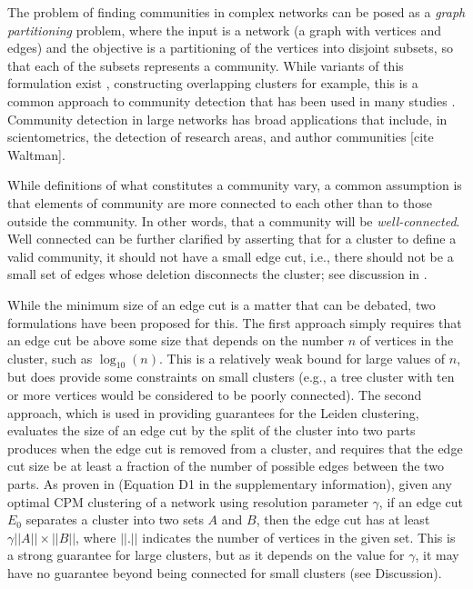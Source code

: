 \documentclass[12pt, oneside]{article}   	%
\begin{document}
The problem of finding communities in complex networks can be posed as a {\em graph partitioning} problem, where the input is a network (a graph with vertices and edges) and the
objective is a partitioning of the vertices into disjoint subsets, so that each of the subsets represents a community. While variants of this formulation exist \citep{Coscia2011}, constructing 
overlapping clusters for example, this is a common approach to community detection that has been used in many studies \citep{Fortunato2022,Fortunato2010}. Community detection in 
large networks has broad applications that include, in scientometrics, the detection of research areas, and author communities [cite Waltman].

While definitions of what constitutes a community vary, a common assumption is that elements of community are more connected to each other than to those outside the community. 
In other words, that a community will be {\em well-connected}. Well connected can be further clarified by asserting that for a cluster to define a valid community, it  should not have a small 
edge cut, i.e., there should not be a small set of edges whose deletion disconnects the cluster; see discussion in \citep{Traag_2019}. 


While the minimum size of an edge cut is a matter that can be debated, two formulations have been proposed for this.
The first approach simply requires that an edge cut be above some size that depends on the number $n$ of vertices in the cluster, such as $\log_{10}(n)$. 
This is a relatively weak bound for large values of $n$, but does provide some constraints on small clusters (e.g., a tree cluster with ten or more vertices would be considered to be poorly connected).  
The second approach, which is used in providing guarantees for the Leiden clustering, evaluates the size of an edge cut by the split  of the cluster into two parts produces when the edge cut is removed from a cluster, and requires that the
edge cut size be at least a fraction of the number of possible edges between the two  parts.
As proven in \citep{Traag_2019} (Equation D1 in the supplementary information), 
given any optimal CPM clustering of a network using resolution parameter $\gamma$, if an edge cut $E_0$
separates a cluster into two sets $A$ and $B$, then the edge cut has at least $\gamma ||A|| \times ||B||$, where
$||.||$ indicates the number of vertices in the given set.
This is a strong guarantee for large clusters,  but as it depends on the value for $\gamma$, it may have no guarantee  beyond being connected for small clusters
(see Discussion). 
\end{document}
